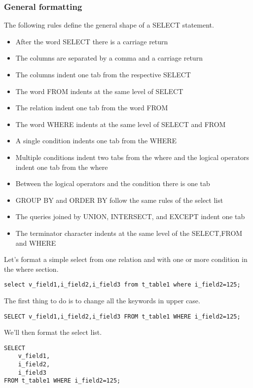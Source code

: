 \subsubsection{General formatting}

The following rules define the general shape of a SELECT statement. 
\begin{itemize}
 \item After the word SELECT there is a carriage return
 \item The columns are separated by a comma and a carriage return
 \item The columns indent one tab from the respective SELECT
 \item The word FROM indents at the same level of SELECT 
 \item The relation indent one tab from the word FROM
 \item The word WHERE indents at the same level of SELECT and FROM
 \item A single condition indents one tab from the WHERE 
 \item Multiple conditions indent two tabs from the where and the logical operators indent one tab from the where
 \item Between the logical operators and the condition there is one tab
 \item GROUP BY and ORDER BY follow the same rules of the select list
 \item The queries joined by UNION, INTERSECT, and EXCEPT indent one tab 
 \item The terminator character indents at the same level of the SELECT,FROM and WHERE
\end{itemize}

Let's format a simple select from one relation and with one or more condition in the where section.

\begin{lstlisting}[style=pgsql]
 select v_field1,i_field2,i_field3 from t_table1 where i_field2=125;
\end{lstlisting}

The first thing to do is to change all the keywords in upper case.

\begin{lstlisting}[style=pgsql]
 SELECT v_field1,i_field2,i_field3 FROM t_table1 WHERE i_field2=125;
\end{lstlisting}

We'll then format the select list.

\begin{lstlisting}[style=pgsql]
SELECT 
	v_field1,
	i_field2,
	i_field3 
FROM t_table1 WHERE i_field2=125;
\end{lstlisting}

